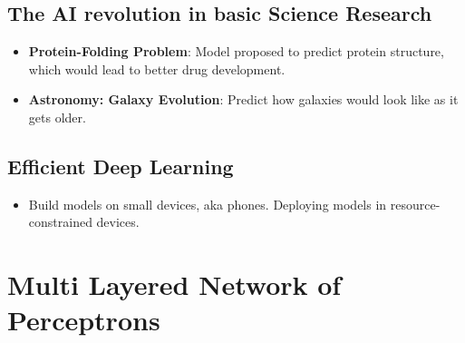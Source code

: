 \documentclass[a4paper]{article}
\begin{document}
\subsection{The AI revolution in basic Science Research}
\begin{itemize}
    \item \textbf{Protein-Folding Problem}: Model proposed to predict protein structure, which would lead to better drug development.
    \item \textbf{Astronomy: Galaxy Evolution}: Predict how galaxies would look like as it gets older.
\end{itemize}

\subsection{Efficient Deep Learning}

\begin{itemize}
    \item Build models on small devices, aka phones. Deploying models in resource-constrained devices.
\end{itemize}

\section{Multi Layered Network of Perceptrons}
\end{document}
